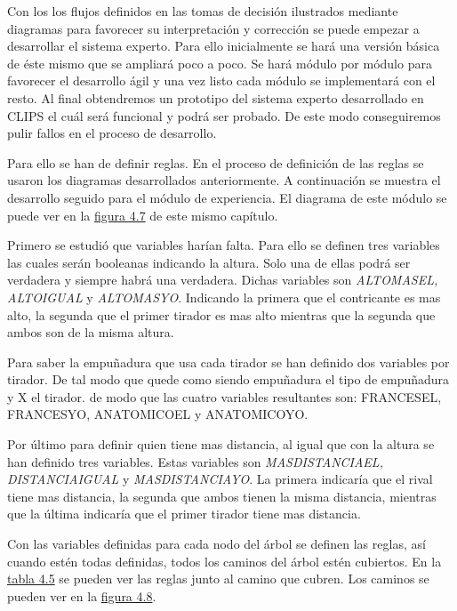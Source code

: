 Con los los flujos definidos en las tomas de decisión ilustrados mediante diagramas para favorecer
su interpretación y corrección se puede empezar a desarrollar el sistema experto. Para ello inicialmente
se hará una versión básica de éste mismo que se ampliará poco a poco. Se hará módulo por módulo
para favorecer el desarrollo ágil y una vez listo cada módulo se implementará con el resto.
Al final obtendremos un prototipo del sistema experto desarrollado en CLIPS el cuál será
funcional y podrá ser probado. De este modo conseguiremos pulir fallos en el proceso de desarrollo.

Para ello se han de definir reglas. En el proceso de definición de las reglas se usaron los
diagramas desarrollados anteriormente. A continuación se muestra el desarrollo seguido para el
módulo de experiencia. El diagrama de este módulo se puede ver en la \hyperref[fig:Arbol decisión experiencia]{figura 4.7} de este mismo capítulo.

Primero se estudió que variables harían falta. Para ello se definen tres variables las cuales serán booleanas
indicando la altura. Solo una de ellas podrá ser verdadera y siempre habrá una verdadera. Dichas variables son
\textit{ALTOMASEL, ALTOIGUAL} y \textit{ALTOMASYO}. Indicando la primera que el contricante es mas alto, la segunda
que el primer tirador es mas alto mientras que la segunda que ambos son de la misma altura.

Para saber la empuñadura que usa cada tirador se han definido dos variables por tirador. De tal modo que quede como
 siendo empuñadura el tipo de empuñadura y X el tirador. de modo que las cuatro variables
resultantes son: FRANCESEL, FRANCESYO, ANATOMICOEL y ANATOMICOYO.

Por último para definir quien tiene mas distancia, al igual que con la altura se han definido tres variables.
Estas variables son \textit{MASDISTANCIAEL, DISTANCIAIGUAL} y \textit{MASDISTANCIAYO}. La primera indicaría
que el rival tiene mas distancia, la segunda que ambos tienen la misma distancia, mientras que la última
indicaría que el primer tirador tiene mas distancia.

Con las variables definidas para cada nodo del árbol se definen las reglas, así
cuando estén todas definidas, todos los caminos del árbol estén cubiertos. En la \hyperref[tab:Reglas distancia]{tabla 4.5} se pueden ver
las reglas junto al camino que cubren. Los caminos se pueden ver en la \hyperref[fig:Arbol decisión distancia con caminos numerados]{figura 4.8}.

